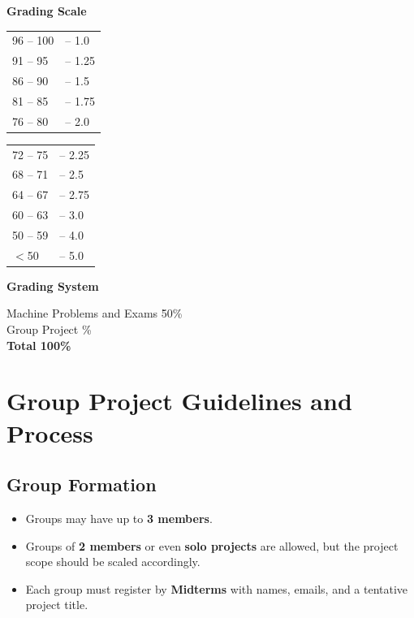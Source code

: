 \documentclass[a4paper,10pt]{article}
\begin{document}
\noindent \textbf{Grading Scale}
\begin{multicols}{2}
\noindent
    \begin{tabular}{ll}
        96 -- 100 & -- 1.0 \\
        91 -- 95  & -- 1.25 \\
        86 -- 90  & -- 1.5 \\
        81 -- 85  & -- 1.75 \\
        76 -- 80  & -- 2.0 \\
    \end{tabular}
    
    \columnbreak
    
    \begin{tabular}{ll}
        72 -- 75  & -- 2.25 \\
        68 -- 71  & -- 2.5 \\
        64 -- 67  & -- 2.75 \\
        60 -- 63  & -- 3.0 \\
        50 -- 59  & -- 4.0 \\
        $<$50        & -- 5.0 \\
    \end{tabular}
\end{multicols}

\vspace{1em}


\noindent \textbf{Grading System}
\begin{tabbing}
Machine Problems and Exams \hspace{3em} \= 50\% \\
Group Project \% \\
\hspace{6em} \= \textbf{Total 100\%} \\
\end{tabbing}

\vspace{1.0em}


\section*{Group Project Guidelines and Process}

\subsection*{Group Formation}
\begin{itemize}
    \item Groups may have up to \textbf{3 members}.
    \item Groups of \textbf{2 members} or even \textbf{solo projects} are allowed, but the project scope should be scaled accordingly.
    \item Each group must register by \textbf{Midterms} with names, emails, and a tentative project title.
\end{itemize}
\end{document}
